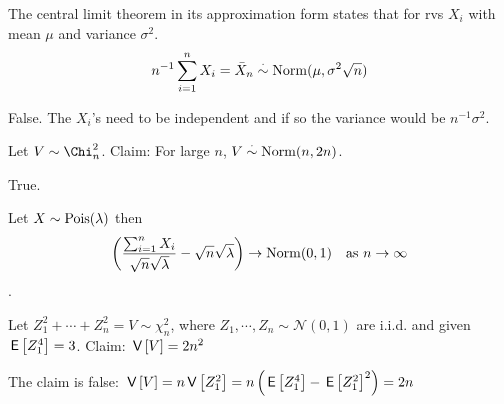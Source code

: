 \documentclass[tf-tutorial-all.tex]{subfiles}
\begin{document}
\begin{truefalse}
  The central limit theorem in its approximation form states that for
  rvs $X_i$ with mean $\mu$ and variance $\sigma^2$.
  $$ n^{-1}\sum_{i=1}^n X_i = \bar X_n \stackrel{\cdot}\sim \mathrm{Norm}(\mu, \sigma^2 \sqrt{n}) $$
\begin{solution}
False. The $X_i$'s need to be independent and if so the variance would be $n^{-1}\sigma^2$.
\end{solution}
\end{truefalse}

\begin{truefalse}
  Let $V \sim \Chi^2_n$. Claim: For large $n$, $V \stackrel{\cdot}\sim \mathrm{Norm}(n, 2n)$.
\begin{solution}
True.
\end{solution}
\end{truefalse}

\begin{truefalse}

Let $X \sim \mathrm{Pois}(\lambda)$ then $$\left( \frac{ \sum^{n}_{i=1} X_{i}}{\sqrt{n} \sqrt{\lambda}} - \sqrt{n}\sqrt{\lambda} \right) \to \mathrm{Norm}(0,1) \quad \text{as } n \to \infty$$.
\end{truefalse}

\begin{truefalse}
Let $Z_1^2 + \cdots + Z_n^2 = V \sim \chi^2_n$, where $Z_1, \cdots ,Z_n \sim \mathcal{N}(0,1)$ are i.i.d. and given $\,\mathsf{E}\left[Z_1^4\right] = 3$. Claim:
$\,\mathsf{V}\left[V\right] = 2n^2$
\begin{solution}
The claim is false: $\,\mathsf{V}\left[V\right] = n\,\mathsf{V}\left[Z_1^2\right] = n\left(\,\mathsf{E}\left[Z_1^4\right] - \,\mathsf{E}\left[Z_1^2\right]^2\right) = 2n$

\end{solution}
\end{truefalse}
\end{document}
